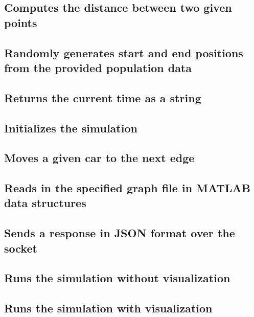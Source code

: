 \documentclass[11pt]{article}
\begin{document}
\begin{appendices}
		\newpage
		\subsection*{Computes the distance between two given points}
			

		\newpage
		\subsection*{Randomly generates start and end positions from the provided population data}
			

		\newpage
		\subsection*{Returns the current time as a string}
			

		\newpage
		\subsection*{Initializes the simulation}
			

		\newpage
		\subsection*{Moves a given car to the next edge}
			

		\newpage
		\subsection*{Reads in the specified graph file in MATLAB data structures}
			

		\newpage
		\subsection*{Sends a response in JSON format over the socket}
			

		\newpage
		\subsection*{Runs the simulation without visualization}
			

		\newpage
		\subsection*{Runs the simulation with visualization}
			


\end{appendices}
\end{document}
